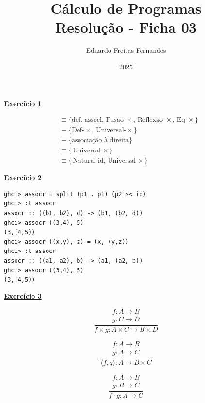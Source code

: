 \documentclass[a4paper,11pt]{article}
\title{Cálculo de Programas \\ Resolução - Ficha 03}
\author{Eduardo Freitas Fernandes}
\date{2025}
\begin{document}
	
	\maketitle
	
	\noindent \underline{\textbf{Exercício 1}}
	\begin{center}
		\begin{minipage}{0.6\textwidth}
			\begin{mdframed}
				\[
				\begin{aligned}
					&\equiv \{\text{def. assocl, Fusão-$\times$, Reflexão-$\times$, Eq-$\times$}\}\\
					&\equiv \{\text{Def-$\times$, Universal-$\times$}\}\\
					&\equiv \{\text{associação à direita}\}\\
					&\equiv \{\text{Universal-$\times$}\}\\
					&\equiv \{\text{Natural-id, Universal-$\times$}\}
				\end{aligned}
				\]
			\end{mdframed}
		\end{minipage}
	\end{center}
	
	
	\noindent \underline{\textbf{Exercício 2}}
\begin{verbatim}
ghci> assocr = split (p1 . p1) (p2 >< id)
ghci> :t assocr
assocr :: ((b1, b2), d) -> (b1, (b2, d))
ghci> assocr ((3,4), 5)
(3,(4,5))
ghci> assocr ((x,y), z) = (x, (y,z))
ghci> :t assocr
assocr :: ((a1, a2), b) -> (a1, (a2, b))
ghci> assocr ((3,4), 5)
(3,(4,5))
\end{verbatim}
	
	
	\noindent \underline{\textbf{Exercício 3}}
	
	
	\begin{minipage}{0.3\textwidth}
		\[
		\frac{
			\begin{array}{c}
				f: A \rightarrow B \\
				g: C \rightarrow D
			\end{array}
		}{
			f \times g: A \times C \rightarrow B \times D
		}
		\]
	\end{minipage}
	\hfill
	\begin{minipage}{0.3\textwidth}
		\[
		\frac{
			\begin{array}{c}
				f: A \rightarrow B \\
				g: A \rightarrow C
			\end{array}
		}{
			\langle f, g \rangle : A \rightarrow B \times C
		}
		\]
	\end{minipage}
	\hfill
	\begin{minipage}{0.3\textwidth}
		\[
		\frac{
			\begin{array}{c}
				f: A \rightarrow B \\
				g: B \rightarrow C
			\end{array}
		}{
			f \cdot g: A \rightarrow C
		}
		\]
	\end{minipage}
	
\end{document}
